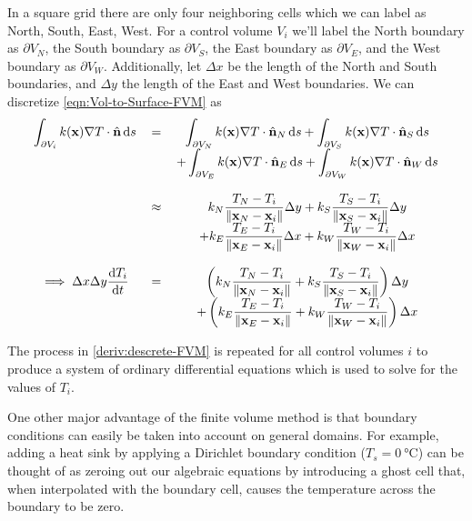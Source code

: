 In a square grid there are only four neighboring cells which we can label as North, South, East, West. For a control volume $V_i$ we'll label the North boundary as $\partial V_N$, the South boundary as $\partial V_S$, the East boundary as $\partial V_E$, and the West boundary as $\partial V_W$. Additionally, let $\Delta x$ be the length of the North and South boundaries, and $\Delta y$ the length of the East and West boundaries. We can discretize \eqref{eqn:Vol-to-Surface-FVM} as
\begin{equation}
	\begin{tabular}{ccc}
		$\displaystyle\int_{\partial V_i}k(\mathbf{x})\nabla T\cdot\hat{\mathbf{n}}\dif s$ & $=$ & $\displaystyle\int_{\partial V_N}k(\mathbf{x})\nabla T\cdot\hat{\mathbf{n}}_N\dif s+\int_{\partial V_S}k(\mathbf{x})\nabla T\cdot\hat{\mathbf{n}}_S\dif s$\\
		 &  & $\displaystyle+\int_{\partial V_E}k(\mathbf{x})\nabla T\cdot\hat{\mathbf{n}}_E\dif s+\int_{\partial V_W}k(\mathbf{x})\nabla T\cdot\hat{\mathbf{n}}_W\dif s$\\
		 & & \\
		 & $\approx$ & $\displaystyle k_N\frac{T_N-T_i}{\|\mathbf{x}_N-\mathbf{x}_i\|}\Delta y+k_S\frac{T_S-T_i}{\|\mathbf{x}_S-\mathbf{x}_i\|}\Delta y$\\
		 & & $\displaystyle+k_E\frac{T_E-T_i}{\|\mathbf{x}_E-\mathbf{x}_i\|}\Delta x+k_W\frac{T_W-T_i}{\|\mathbf{x}_W-\mathbf{x}_i\|}\Delta x$\\
		 & & \\
		 $\displaystyle\implies \Delta x\Delta y\frac{\dif T_i}{\dif t}$ & $=$ & $\displaystyle\left( k_N\frac{T_N-T_i}{\|\mathbf{x}_N-\mathbf{x}_i\|}+k_S\frac{T_S-T_i}{\|\mathbf{x}_S-\mathbf{x}_i\|}\right)\Delta y$\\
		 & & $\displaystyle+\left(k_E\frac{T_E-T_i}{\|\mathbf{x}_E-\mathbf{x}_i\|}+k_W\frac{T_W-T_i}{\|\mathbf{x}_W-\mathbf{x}_i\|}\right)\Delta x$
	\end{tabular}\label{deriv:descrete-FVM}
\end{equation}

The process in \eqref{deriv:descrete-FVM} is repeated for all control volumes $i$ to produce a system of ordinary differential equations which is used to solve for the values of $T_i$.

One other major advantage of the finite volume method is that boundary conditions can easily be taken into account on general domains. For example, adding a heat sink by applying a Dirichlet boundary condition ($T_s=\SI{0}{\degreeCelsius}$) can be thought of as zeroing out our algebraic equations by introducing a ghost cell that, when interpolated with the boundary cell, causes the temperature across the boundary to be zero.